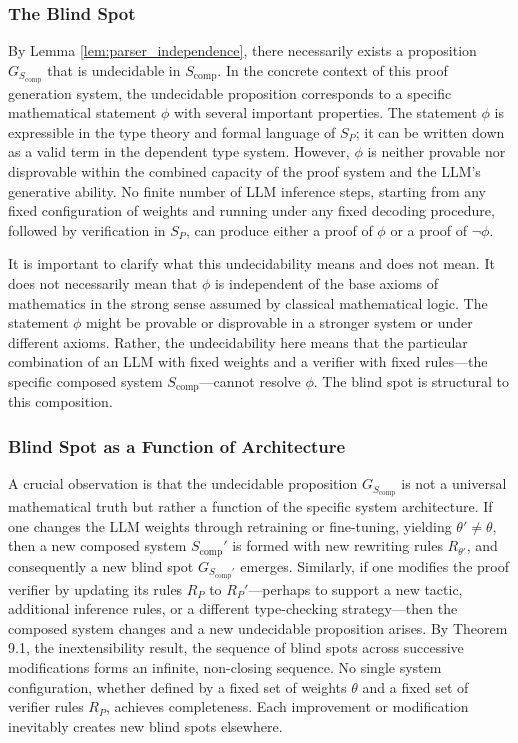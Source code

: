 \documentclass[11pt]{article}
\begin{document}
\subsubsection{The Blind Spot}

By Lemma \ref{lem:parser_independence}, there necessarily exists a proposition $G_{S_{\text{comp}}}$ that is undecidable in $S_{\text{comp}}$. In the concrete context of this proof generation system, the undecidable proposition corresponds to a specific mathematical statement $\phi$ with several important properties. The statement $\phi$ is expressible in the type theory and formal language of $S_P$; it can be written down as a valid term in the dependent type system. However, $\phi$ is neither provable nor disprovable within the combined capacity of the proof system and the LLM's generative ability. No finite number of LLM inference steps, starting from any fixed configuration of weights and running under any fixed decoding procedure, followed by verification in $S_P$, can produce either a proof of $\phi$ or a proof of $\neg\phi$.

It is important to clarify what this undecidability means and does not mean. It does not necessarily mean that $\phi$ is independent of the base axioms of mathematics in the strong sense assumed by classical mathematical logic. The statement $\phi$ might be provable or disprovable in a stronger system or under different axioms. Rather, the undecidability here means that the particular combination of an LLM with fixed weights and a verifier with fixed rules—the specific composed system $S_{\text{comp}}$—cannot resolve $\phi$. The blind spot is structural to this composition.

\subsubsection{Blind Spot as a Function of Architecture}

A crucial observation is that the undecidable proposition $G_{S_{\text{comp}}}$ is not a universal mathematical truth but rather a function of the specific system architecture. If one changes the LLM weights through retraining or fine-tuning, yielding $\theta' \neq \theta$, then a new composed system $S_{\text{comp}}'$ is formed with new rewriting rules $R_{\theta'}$, and consequently a new blind spot $G_{S_{\text{comp}}'}$ emerges. Similarly, if one modifies the proof verifier by updating its rules $R_P$ to $R_P'$—perhaps to support a new tactic, additional inference rules, or a different type-checking strategy—then the composed system changes and a new undecidable proposition arises. By Theorem 9.1, the inextensibility result, the sequence of blind spots across successive modifications forms an infinite, non-closing sequence. No single system configuration, whether defined by a fixed set of weights $\theta$ and a fixed set of verifier rules $R_P$, achieves completeness. Each improvement or modification inevitably creates new blind spots elsewhere.
\end{document}
